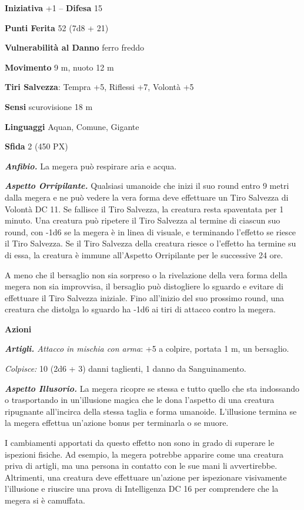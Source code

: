 \begin{multicols}{2}
	\textbf{Iniziativa} +1 -- \textbf{Difesa} 15

	\textbf{Punti Ferita} 52 (7d8 + 21)

	\textbf{Vulnerabilità al Danno} ferro freddo

	\textbf{Movimento} 9 m, nuoto 12 m

	\textbf{Tiri Salvezza}: Tempra +5, Riflessi +7, Volontà +5

	\textbf{Sensi} scurovisione 18 m

	\textbf{Linguaggi} Aquan, Comune, Gigante

	\textbf{Sfida} 2 (450 PX)

	\textit{\textbf{Anfibio.}} La megera può respirare aria e acqua.

	\textit{\textbf{Aspetto Orripilante.}} Qualsiasi umanoide che inizi il suo round entro 9 metri dalla megera e ne può vedere la vera forma deve effettuare un Tiro Salvezza di Volontà DC 11. Se fallisce il Tiro Salvezza, la creatura resta spaventata per 1 minuto. Una creatura può ripetere il Tiro Salvezza al termine di ciascun suo round, con -1d6 se la megera è in linea di visuale, e terminando l'effetto se riesce il Tiro Salvezza. Se il Tiro Salvezza della creatura riesce o l'effetto ha termine su di essa, la creatura è immune all'Aspetto Orripilante per le successive 24 ore.

	A meno che il bersaglio non sia sorpreso o la rivelazione della vera forma della megera non sia improvvisa, il bersaglio può distogliere lo sguardo e evitare di effettuare il Tiro Salvezza iniziale. Fino all'inizio del suo prossimo round, una creatura che distolga lo sguardo
	ha -1d6 ai tiri di attacco contro la megera.

	\textbf{Azioni}

	\textit{\textbf{Artigli.} Attacco in mischia con arma}: +5 a colpire, portata 1 m, un bersaglio.

	\textit{Colpisce:} 10 (2d6 + 3) danni taglienti, 1 danno da Sanguinamento.

	\textit{\textbf{Aspetto Illusorio.}} La megera ricopre se stessa e tutto quello che sta indossando o trasportando in un'illusione magica che le dona l'aspetto di una creatura ripugnante all'incirca della stessa taglia e forma umanoide. L'illusione termina se la megera effettua un'azione bonus per terminarla o se muore.

	I cambiamenti apportati da questo effetto non sono in grado di superare le ispezioni fisiche. Ad esempio, la megera potrebbe apparire come una creatura priva di artigli, ma una persona in contatto con le sue mani li avvertirebbe. Altrimenti, una creatura deve effettuare un'azione per ispezionare visivamente l'illusione e riuscire una prova di Intelligenza DC 16 per comprendere che la megera si è camuffata.


\end{multicols}
